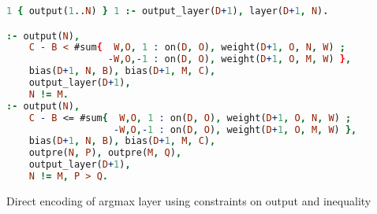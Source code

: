 \begin{code}
\begin{lstlisting}[language=Prolog, numbers=none]
1 { output(1..N) } 1 :- output_layer(D+1), layer(D+1, N).

:- output(N),
    C - B < #sum{  W,O, 1 : on(D, O), weight(D+1, O, N, W) ;
                  -W,O,-1 : on(D, O), weight(D+1, O, M, W) },
    bias(D+1, N, B), bias(D+1, M, C),
    output_layer(D+1),
    N != M.
:- output(N),
    C - B <= #sum{  W,O, 1 : on(D, O), weight(D+1, O, N, W) ;
                   -W,O,-1 : on(D, O), weight(D+1, O, M, W) },
    bias(D+1, N, B), bias(D+1, M, C),
    outpre(N, P), outpre(M, Q),
    output_layer(D+1),
    N != M, P > Q.
\end{lstlisting}
    \caption{Direct encoding of argmax layer using constraints on output and inequality}\label{enc:argmax_direct}
\end{code}

